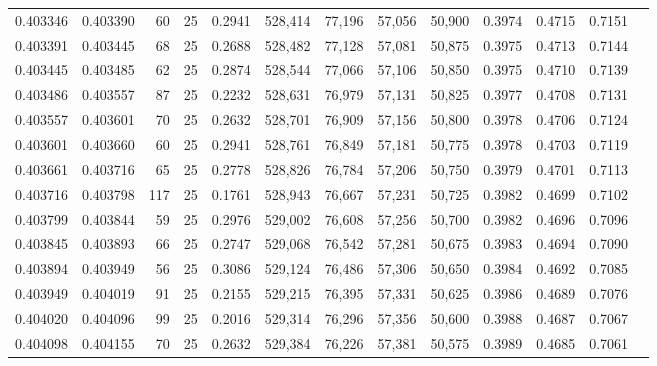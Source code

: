 \begin{tabular}{rrrrrrrrrrrrr}
0.403346 & 0.403390 &    60 &  25 &                                     0.2941 & 528,414 &  77,196 &  57,056 &  50,900 & 0.3974 & 0.4715 & 0.7151 \\
0.403391 & 0.403445 &    68 &  25 &                                     0.2688 & 528,482 &  77,128 &  57,081 &  50,875 & 0.3975 & 0.4713 & 0.7144 \\
0.403445 & 0.403485 &    62 &  25 &                                     0.2874 & 528,544 &  77,066 &  57,106 &  50,850 & 0.3975 & 0.4710 & 0.7139 \\
0.403486 & 0.403557 &    87 &  25 &                                     0.2232 & 528,631 &  76,979 &  57,131 &  50,825 & 0.3977 & 0.4708 & 0.7131 \\
0.403557 & 0.403601 &    70 &  25 &                                     0.2632 & 528,701 &  76,909 &  57,156 &  50,800 & 0.3978 & 0.4706 & 0.7124 \\
0.403601 & 0.403660 &    60 &  25 &                                     0.2941 & 528,761 &  76,849 &  57,181 &  50,775 & 0.3978 & 0.4703 & 0.7119 \\
0.403661 & 0.403716 &    65 &  25 &                                     0.2778 & 528,826 &  76,784 &  57,206 &  50,750 & 0.3979 & 0.4701 & 0.7113 \\
0.403716 & 0.403798 &   117 &  25 &                                     0.1761 & 528,943 &  76,667 &  57,231 &  50,725 & 0.3982 & 0.4699 & 0.7102 \\
0.403799 & 0.403844 &    59 &  25 &                                     0.2976 & 529,002 &  76,608 &  57,256 &  50,700 & 0.3982 & 0.4696 & 0.7096 \\
0.403845 & 0.403893 &    66 &  25 &                                     0.2747 & 529,068 &  76,542 &  57,281 &  50,675 & 0.3983 & 0.4694 & 0.7090 \\
0.403894 & 0.403949 &    56 &  25 &                                     0.3086 & 529,124 &  76,486 &  57,306 &  50,650 & 0.3984 & 0.4692 & 0.7085 \\
0.403949 & 0.404019 &    91 &  25 &                                     0.2155 & 529,215 &  76,395 &  57,331 &  50,625 & 0.3986 & 0.4689 & 0.7076 \\
0.404020 & 0.404096 &    99 &  25 &                                     0.2016 & 529,314 &  76,296 &  57,356 &  50,600 & 0.3988 & 0.4687 & 0.7067 \\
0.404098 & 0.404155 &    70 &  25 &                                     0.2632 & 529,384 &  76,226 &  57,381 &  50,575 & 0.3989 & 0.4685 & 0.7061 \\

\end{tabular}
